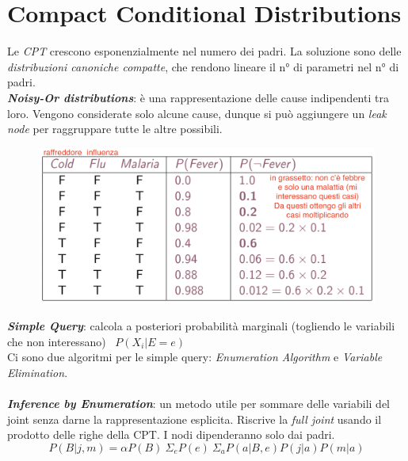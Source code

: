 \documentclass[a4paper, notitlepage, 9pt]{extreport}
\begin{document}
\section*{Compact Conditional Distributions}
\begin{multicols}{2}
	\noindent
	Le \textit{CPT} crescono esponenzialmente nel numero dei padri. La soluzione sono delle \textit{distribuzioni canoniche compatte}, che rendono lineare il n° di parametri nel n° di padri.\\
	\textit{\textbf{Noisy-Or distributions}}: è una rappresentazione delle cause indipendenti tra loro. Vengono considerate solo alcune cause, dunque si può aggiungere un \textit{leak node} per raggruppare tutte le altre possibili.
	\columnbreak
	\begin{figure}[H]
		\centering
		\includegraphics[scale=0.21]{Tab}
	\end{figure}
\end{multicols}
\noindent
\textit{\textbf{Simple Query}}: calcola a posteriori probabilità marginali (togliendo le variabili che non interessano) ~$P(X_i | E=e)$\\
Ci sono due algoritmi per le simple query: \textit{Enumeration Algorithm} e \textit{Variable Elimination}.\\\\
\textit{\textbf{Inference by Enumeration}}: un metodo utile per sommare delle variabili del joint senza darne la rappresentazione esplicita. Riscrive la \textit{full joint} usando il prodotto delle righe della CPT. I nodi dipenderanno solo dai padri.
$$P(B|j, m) = \alpha P(B) ~\Sigma_e P(e) ~\Sigma_a P(a | B, e) P(j | a) P(m | a) $$
\end{document}
